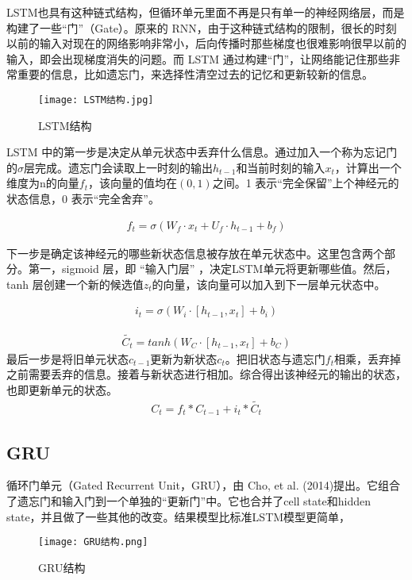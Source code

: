 LSTM也具有这种链式结构，但循环单元里面不再是只有单一的神经网络层，而是构建了一些“门”（Gate）。原来的 RNN，由于这种链式结构的限制，很长的时刻以前的输入对现在的网络影响非常小，后向传播时那些梯度也很难影响很早以前的输入，即会出现梯度消失的问题。而 LSTM 通过构建“门”，让网络能记住那些非常重要的信息，比如遗忘门，来选择性清空过去的记忆和更新较新的信息。
\begin{figure}
    \centering
    \texttt{[image: LSTM结构.jpg]}
    \caption{LSTM结构}
    \label{fig:LSTM结构}
  \end{figure}
  LSTM 中的第一步是决定从单元状态中丢弃什么信息。通过加入一个称为忘记门的$\sigma$层完成。遗忘门会读取上一时刻的输出$h_{t-1}$和当前时刻的输入$x_t$，计算出一个维度为n的向量$f_t$，该向量的值均在$(0, 1)$之间。1 表示“完全保留”上个神经元的状态信息，0 表示“完全舍弃”。

\begin{equation}
    \begin{aligned}
        f_t = \sigma(W_f\cdot x_t + U_f\cdot h_{t-1} + b_f)
    \end{aligned}
\end{equation}

下一步是确定该神经元的哪些新状态信息被存放在单元状态中。这里包含两个部分。第一，sigmoid 层，即 “输入门层” ，决定LSTM单元将更新哪些值。然后， tanh 层创建一个新的候选值$z_t$的向量，该向量可以加入到下一层单元状态中。

\begin{equation}
    \begin{aligned}
        i_t = \sigma(W_i\cdot[h_{t-1},x_t] + b_i)
    \end{aligned}
\end{equation}

\begin{equation}
    \begin{aligned}
        \widetilde {C_t} = tanh(W_C\cdot[h_{t-1},x_t]+b_C)
    \end{aligned}
\end{equation}
最后一步是将旧单元状态$c_{t-1}$更新为新状态$c_t$。把旧状态与遗忘门$f_t$相乘，丢弃掉之前需要丢弃的信息。接着与新状态进行相加。综合得出该神经元的输出的状态，也即更新单元的状态。
\begin{equation}
    \begin{aligned}
        C_t = f_t * C_{t-1} + i_t * \widetilde{C_t}
    \end{aligned}
\end{equation}

\subsection{GRU}
循环门单元（Gated Recurrent Unit，GRU），由 Cho, et al. (2014)提出。它组合了遗忘门和输入门到一个单独的“更新门”中。它也合并了cell state和hidden state，并且做了一些其他的改变。结果模型比标准LSTM模型更简单，
\begin{figure}
    \centering
    \texttt{[image: GRU结构.png]}
    \caption{GRU结构}
    \label{fig:GRU结构}
  \end{figure}

